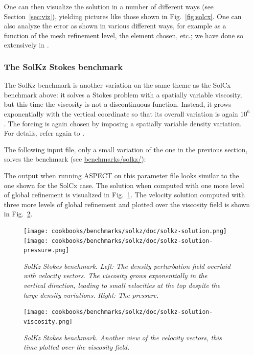 \documentclass{article}
\newcommand{\aspect}{\textsc{ASPECT}}
\begin{document}
One can then visualize the solution in a number of different ways (see
Section~\ref{sec:viz}), yielding pictures like those shown in
Fig.~\ref{fig:solcx}. One can also analyze the error as shown in various
different ways, for example as a function of the mesh refinement level, the
element chosen, etc.; we have done so extensively in \cite{KHB12}.


\subsubsection{The SolKz Stokes benchmark}
\label{sec:benchmark-solkz}

The SolKz benchmark is another variation on the same theme as the SolCx
benchmark above: it solves a Stokes problem with a spatially variable
viscosity, but this time the viscosity is not a discontinuous function. Instead,
it grows exponentially with the vertical coordinate so that its overall
variation is again $10^6$. The forcing is again chosen by imposing a spatially
variable density variation. For details, refer again to \cite{DMGT11}.

The following input file, only a small variation of the one in the previous
section, solves the benchmark (see \url{benchmarks/solkz/}):



The output when running \aspect{} on this parameter file looks similar to the
one shown for the SolCx case. The solution when computed with one more level
of global refinement is visualized in Fig.~\ref{fig:solkz}. The velocity solution
computed with three more levels of global refinement and plotted over the viscosity
field is shown in Fig.~\ref{fig:solkz2}.

\begin{figure}
  \begin{center}
    \texttt{[image: cookbooks/benchmarks/solkz/doc/solkz-solution.png]}
    \hfill
    \texttt{[image: cookbooks/benchmarks/solkz/doc/solkz-solution-pressure.png]}
    \caption{\it SolKz Stokes benchmark. Left: The density perturbation field
    overlaid with velocity vectors. The viscosity grows exponentially
      in the vertical direction, leading to small velocities at the top
      despite the large density variations. Right: The pressure.}
    \label{fig:solkz}
  \end{center}
\end{figure}

\begin{figure}
  \begin{center}
    \texttt{[image: cookbooks/benchmarks/solkz/doc/solkz-solution-viscosity.png]}
    \caption{\it SolKz Stokes benchmark. Another view of the velocity vectors, this time plotted over the viscosity field.}
    \label{fig:solkz2}
  \end{center}
\end{figure}
\end{document}
